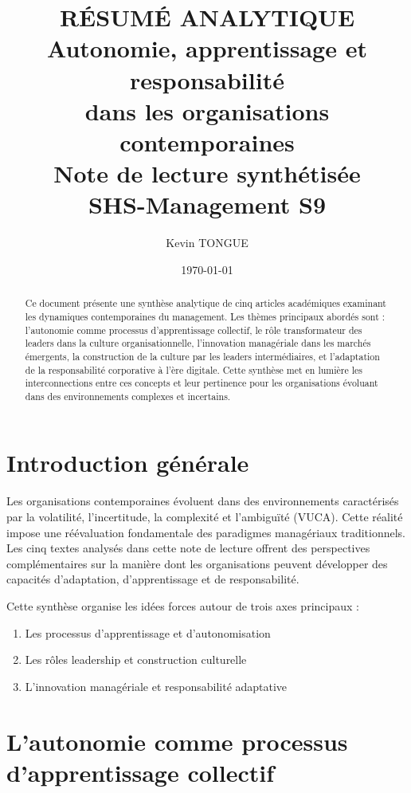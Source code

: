 \documentclass[12pt,a4paper]{article}
\title{
    \vspace{2cm}
    \textbf{RÉSUMÉ ANALYTIQUE} \\
    \vspace{0.5cm}
    \large\textbf{Autonomie, apprentissage et responsabilité} \\
    \large\textbf{dans les organisations contemporaines} \\
    \vspace{1cm}
    \normalsize Note de lecture synthétisée \\
    \normalsize SHS-Management S9
}
\author{Kevin TONGUE}
\date{\today}
\begin{document}
\maketitle
\thispagestyle{empty}

\vspace{2cm}

\begin{abstract}
    \noindent Ce document présente une synthèse analytique de cinq articles académiques examinant les dynamiques contemporaines du management. Les thèmes principaux abordés sont : l'autonomie comme processus d'apprentissage collectif, le rôle transformateur des leaders dans la culture organisationnelle, l'innovation managériale dans les marchés émergents, la construction de la culture par les leaders intermédiaires, et l'adaptation de la responsabilité corporative à l'ère digitale. Cette synthèse met en lumière les interconnections entre ces concepts et leur pertinence pour les organisations évoluant dans des environnements complexes et incertains.
\end{abstract}

\newpage
\tableofcontents
\newpage

\section{Introduction générale}

Les organisations contemporaines évoluent dans des environnements caractérisés par la volatilité, l'incertitude, la complexité et l'ambiguïté (VUCA). Cette réalité impose une réévaluation fondamentale des paradigmes managériaux traditionnels. Les cinq textes analysés dans cette note de lecture offrent des perspectives complémentaires sur la manière dont les organisations peuvent développer des capacités d'adaptation, d'apprentissage et de responsabilité.

Cette synthèse organise les idées forces autour de trois axes principaux :
\begin{enumerate}
    \item Les processus d'apprentissage et d'autonomisation
    \item Les rôles leadership et construction culturelle
    \item L'innovation managériale et responsabilité adaptative
\end{enumerate}

\section{L'autonomie comme processus d'apprentissage collectif}
\end{document}
